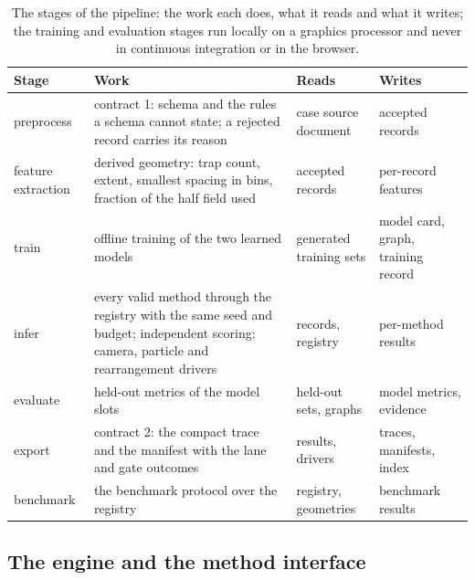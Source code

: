 \begin{table}[t]
\centering\footnotesize
\caption{The stages of the pipeline: the work each does, what it reads and what it writes; the training and evaluation stages run locally on a graphics processor and never in continuous integration or in the browser.}
\label{tab:stages}
\begin{tabular}{@{}l >{\raggedright\arraybackslash}p{} >{\raggedright\arraybackslash}p{} >{\raggedright\arraybackslash}p{}@{}}
\toprule
Stage & Work & Reads & Writes\\
\midrule
preprocess & contract 1: schema and the rules a schema cannot state; a rejected record carries its reason & case source document & accepted records\\
feature extraction & derived geometry: trap count, extent, smallest spacing in bins, fraction of the half field used & accepted records & per-record features\\
train & offline training of the two learned models & generated training sets & model card, graph, training record\\
infer & every valid method through the registry with the same seed and budget; independent scoring; camera, particle and rearrangement drivers & records, registry & per-method results\\
evaluate & held-out metrics of the model slots & held-out sets, graphs & model metrics, evidence\\
export & contract 2: the compact trace and the manifest with the lane and gate outcomes & results, drivers & traces, manifests, index\\
benchmark & the benchmark protocol over the registry & registry, geometries & benchmark results\\
\bottomrule
\end{tabular}
\end{table}

\subsection{The engine and the method interface}\label{sec:arch-engine}

